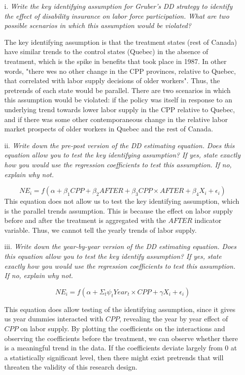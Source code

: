 \documentclass[
]{article}
\begin{document}
\begin{enumerate}
\item[i.] \textit{Write the key identifying assumption for Gruber’s DD strategy to identify the effect of disability insurance on labor force participation. What are two possible scenarios in which this assumption would be violated?}  
  
The key identifying assumption is that the treatment states (rest of Canada) have similar trends to the control states (Quebec) in the absence of treatment, which is the spike in benefits that took place in 1987. In other words, "there wes no other change in the CPP provinces, relative to Quebec, that correlated with labor supply decisions of older workers". Thus, the pretrends of each state would be parallel. There are two scenarios in which this assumption would be violated: if the policy was itself in response to an underlying trend towards lower labor supply in the CPP relative to Quebec, and if there was some other contemporaneous change in the relative labor market prospects of older workers in Quebec and the rest of Canada. 

\item[ii.]  \textit{Write down the pre-post version of the DD estimating equation. Does this equation allow you to test the key identifying assumption? If yes, state exactly how you would use the regression coefficients to test this assumption. If no, explain why not.}  
  
\[NE_i = f(\alpha + \beta_1 CPP + \beta_2 AFTER + \beta_3 CPP \times AFTER + \beta_4 X_i + \epsilon_i)\]
This equation does not allow us to test the key identifying assumption, which is the parallel trends assumption. This is because the effect on labor supply before and after the treatment is aggregated with the $AFTER$ indicator variable. Thus, we cannot tell the yearly trends of labor supply.  
  
\item[iii.] \textit{Write down the year-by-year version of the DD estimating equation. Does this equation allow you to test the key identify assumption? If yes, state exactly how you would use the regression coefficients to test this assumption. If no, explain why not.}  
  
\[NE_i = f(\alpha + \Sigma_t \psi_tYear_t\times CPP +\gamma X_i + \epsilon_i)\]

This equation does allow testing of the identifying assumption, since it gives us year dummies interacted with $CPP$, revealing the year by year effect of $CPP$ on labor supply. By plotting the coefficients on the interactions and observing the coefficients before the treatment, we can observe whether there is a meaningful trend in the data. If the coefficients deviate largely from 0 at a statistically significant level, then there might exist pretrends that will threaten the validity of this research design.  
  

\end{enumerate}
\end{document}

